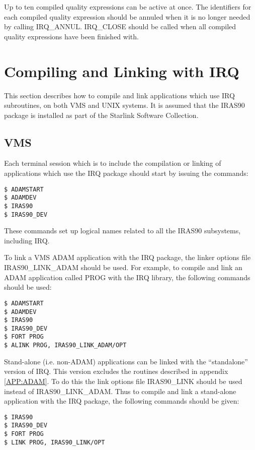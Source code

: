 Up to ten compiled quality expressions can be active at once. The identifiers
for each compiled quality expression should be annuled when it is no longer
needed by calling IRQ\_ANNUL. IRQ\_CLOSE should be called when all compiled
quality expressions have been finished with.

\section {Compiling and Linking with IRQ}
\label{SEC:LINK}
This section describes how to compile and link applications which use IRQ
subroutines, on both VMS and UNIX systems. It is assumed that the IRAS90 package
is installed as part of the Starlink Software Collection.

\subsection{VMS}
Each terminal session which is to include the compilation or linking of
applications which use the IRQ package should start by issuing the commands:

\begin{verbatim}
$ ADAMSTART
$ ADAMDEV
$ IRAS90
$ IRAS90_DEV
\end{verbatim}

These commands set up logical names related to all the IRAS90
subsystems, including IRQ.

To link a VMS ADAM application with the IRQ package, the linker options file
IRAS90\_LINK\_ADAM should be used. For example, to compile and link an ADAM
application called PROG with the IRQ library, the following commands should be
used:

\begin{verbatim}
$ ADAMSTART
$ ADAMDEV
$ IRAS90
$ IRAS90_DEV
$ FORT PROG
$ ALINK PROG, IRAS90_LINK_ADAM/OPT
\end{verbatim}

Stand-alone (i.e. non-ADAM) applications can be linked with the ``standalone''
version of IRQ. This version excludes the routines described in appendix
\ref{APP:ADAM}. To do this the link options file IRAS90\_LINK should be used
instead of IRAS90\_LINK\_ADAM. Thus to compile and link a stand-alone
application with the IRQ package, the following commands should be given:

\begin{verbatim}
$ IRAS90
$ IRAS90_DEV
$ FORT PROG
$ LINK PROG, IRAS90_LINK/OPT
\end{verbatim}

